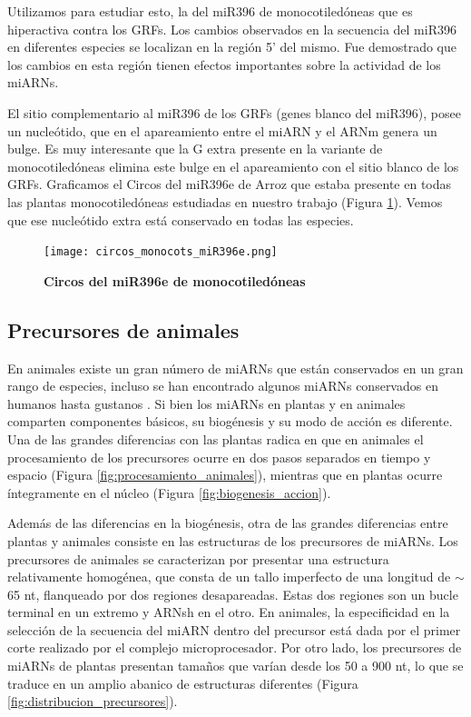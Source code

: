 Utilizamos para estudiar esto, la del miR396 de monocotiledóneas que es hiperactiva contra los GRFs. 
Los cambios observados en la secuencia del miR396 en diferentes especies se localizan en la región 5' del mismo.
Fue demostrado que los cambios en esta región tienen efectos importantes sobre la actividad de los miARNs.

El sitio complementario al miR396 de los GRFs (genes blanco del miR396), posee un nucleótido, que en el apareamiento entre el miARN y el ARNm genera un bulge.
Es muy interesante que la G extra presente en la variante de monocotiledóneas elimina este bulge en el apareamiento con el sitio blanco de los GRFs.
Graficamos el Circos del miR396e de Arroz que estaba presente en todas las plantas monocotiledóneas estudiadas en nuestro trabajo (Figura \ref{fig:circos_monocots_miR396e}).
Vemos que ese nucleótido extra está conservado en todas las especies.

\begin{figure}[htbp!] 
    \centering    
    \texttt{[image: circos\_monocots\_miR396e.png]}
    \caption[Circos del miR172a]{\textbf{Circos del miR396e de monocotiledóneas}}
     \label{fig:circos_monocots_miR396e}
\end{figure}

\subsection{Precursores de animales}

En animales existe un gran número de miARNs que están conservados en un gran rango de especies, incluso se han encontrado algunos miARNs conservados en humanos hasta gustanos \citep{pmid11081512}.
Si bien los miARNs en plantas y en animales comparten componentes básicos, su biogénesis y su modo de acción es diferente.
Una de las grandes diferencias con las plantas radica en que en animales el procesamiento de los precursores ocurre en dos pasos separados
en tiempo y espacio (Figura \ref{fig:procesamiento_animales}), mientras que en plantas ocurre íntegramente en el núcleo (Figura \ref{fig:biogenesis_accion}).

Además de las diferencias en la biogénesis, otra de las grandes diferencias entre plantas y animales consiste en las estructuras de los precursores de miARNs.
Los precursores de animales se caracterizan por presentar una estructura relativamente homogénea, que consta de un tallo imperfecto de una longitud de $\sim$65 nt, flanqueado por dos regiones desapareadas.
Estas dos regiones son un bucle terminal en un extremo y ARNsh en el otro.
En animales, la especificidad en la selección de la secuencia del miARN dentro del precursor está dada por el primer corte realizado por el complejo microprocesador.
Por otro lado, los precursores de miARNs de plantas presentan tamaños que varían desde los 50 a 900 nt, lo que se traduce en un amplio abanico de estructuras diferentes (Figura \ref{fig:distribucion_precursores}).

